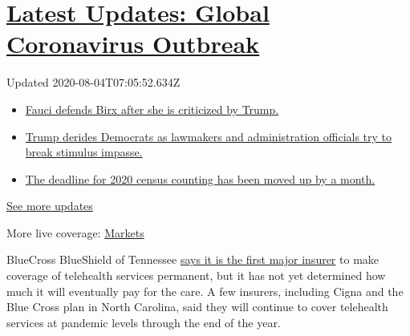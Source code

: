 \hypertarget{latest-updates-global-coronavirus-outbreak}{%
\section{\texorpdfstring{\href{https://www.nytimes.com/2020/08/03/world/coronavirus-covid-19.html?action=click\&pgtype=Article\&state=default\&region=MAIN_CONTENT_1\&context=storylines_live_updates}{Latest
Updates: Global Coronavirus
Outbreak}}{Latest Updates: Global Coronavirus Outbreak}}\label{latest-updates-global-coronavirus-outbreak}}

Updated 2020-08-04T07:05:52.634Z

\begin{itemize}
\tightlist
\item
  \href{https://www.nytimes.com/2020/08/03/world/coronavirus-covid-19.html?action=click\&pgtype=Article\&state=default\&region=MAIN_CONTENT_1\&context=storylines_live_updates\#link-4547638f}{Fauci
  defends Birx after she is criticized by Trump.}
\item
  \href{https://www.nytimes.com/2020/08/03/world/coronavirus-covid-19.html?action=click\&pgtype=Article\&state=default\&region=MAIN_CONTENT_1\&context=storylines_live_updates\#link-15e7f995}{Trump
  derides Democrats as lawmakers and administration officials try to
  break stimulus impasse.}
\item
  \href{https://www.nytimes.com/2020/08/03/world/coronavirus-covid-19.html?action=click\&pgtype=Article\&state=default\&region=MAIN_CONTENT_1\&context=storylines_live_updates\#link-e5a2cda}{The
  deadline for 2020 census counting has been moved up by a month.}
\end{itemize}

\href{https://www.nytimes.com/2020/08/03/world/coronavirus-covid-19.html?action=click\&pgtype=Article\&state=default\&region=MAIN_CONTENT_1\&context=storylines_live_updates}{See
more updates}

More live coverage:
\href{https://www.nytimes.com/live/2020/08/03/business/stock-market-today-coronavirus?action=click\&pgtype=Article\&state=default\&region=MAIN_CONTENT_1\&context=storylines_live_updates}{Markets}

BlueCross BlueShield of Tennessee
\href{https://bcbstnews.com/pressreleases/bluecross-making-in-network-telehealth-services-permanent/}{says
it is the first major insurer} to make coverage of telehealth services
permanent, but it has not yet determined how much it will eventually pay
for the care. A few insurers, including Cigna and the Blue Cross plan in
North Carolina, said they will continue to cover telehealth services at
pandemic levels through the end of the year.

